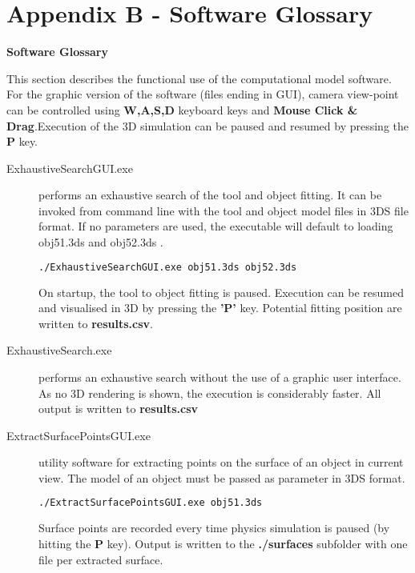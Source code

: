 \documentclass[11]{article}
\let \shorttitle \textbf
\begin{document}
\section{Appendix B - Software Glossary}
\shorttitle{Software Glossary}

This section describes the functional use of the computational model software. 
For the graphic version of the software (files ending in GUI), camera view-point can be controlled using \textbf{W,A,S,D} keyboard keys and \textbf{Mouse Click \& Drag}.Execution of the 3D simulation can be paused and resumed by pressing the \textbf{P} key.

\begin{description}

  \item [ExhaustiveSearchGUI.exe] performs an exhaustive search of the tool and object fitting. It can be invoked from command line with the tool and object model files 	in 3DS file format. If no parameters are used, the executable will default to loading obj51.3ds and obj52.3ds .

    \begin{lstlisting}[language=bash]
  ./ExhaustiveSearchGUI.exe obj51.3ds obj52.3ds
    \end{lstlisting}

    On startup, the tool to object fitting is paused. Execution can be resumed and visualised in 3D by pressing the \textbf{'P'} key.
    Potential fitting position are written to \textbf{results.csv}.

  \item [ExhaustiveSearch.exe] performs an exhaustive search without the use of a graphic user interface. As no 3D rendering is shown, the execution is considerably faster. All output is written to \textbf{results.csv}

  \item [ExtractSurfacePointsGUI.exe] utility software for extracting points on the surface of an object in current view. The model of an object must be passed as parameter in 3DS format. 

    \begin{lstlisting}[language=bash]
  ./ExtractSurfacePointsGUI.exe obj51.3ds
    \end{lstlisting}

    Surface points are recorded every time physics simulation is paused (by hitting the \textbf{P} key).
    Output is written to the \textbf{./surfaces} subfolder with one file per extracted surface.   


\end{description}
\end{document}
